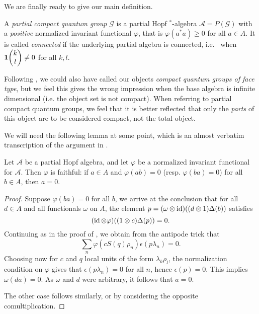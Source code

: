We are finally ready to give our main definition.

\begin{Def} A \emph{partial compact quantum group} $\mathscr{G}$ is a partial Hopf $^*$-algebra $\mathscr{A} = P(\mathscr{G})$ with a \emph{positive} normalized invariant functional $\varphi$, that is $\varphi(a^*a)\geq 0$ for all $a\in A$. It is called \emph{connected} if the underlying partial algebra is connected, i.e.~ when $\mathbf{1}\!\begin{pmatrix} k \\ l\end{pmatrix}\neq0$ for all $k,l$. %
\end{Def} 

\begin{Rem} Following \cite{Hay1}, we could also have called our objects \emph{compact quantum groups of face type}, but we feel this gives the wrong impression when the base algebra is infinite dimensional (i.e. the object set is not compact). When referring to partial compact quantum groups, we feel that it is better reflected that only the \emph{parts} of this object are to be considered compact, not the total object. %
\end{Rem} 

We will need the following lemma at some point, which is an almost verbatim transcription of the argument in \cite[Proposition 3.4]{VDae2}.

\begin{Lem} Let $\mathscr{A}$ be a partial Hopf algebra, and let $\varphi$ be a normalized invariant functional for $\mathscr{A}$. Then $\varphi$ is faithful: if $a\in A$ and $\varphi(ab) =0$ (resp. $\varphi(ba)=0$) for all $b\in A$, then $a=0$.
\end{Lem} 
\begin{proof} Suppose  $\varphi(ba)=0$ for all $b$, we arrive at the conclusion that for all $d\in A$ and all functionals $\omega$ on $A$, the element $p = (\omega\otimes \operatorname{id})((d\otimes 1)\Delta(b))$ satisfies \[(\operatorname{id}\otimes \varphi)((1\otimes c)\Delta(p)) = 0.\] Continuing as in the proof of \cite[Proposition 3.4]{VDae2}, we obtain from the antipode trick that \[\sum_n \varphi(cS(q)\rho_n)\epsilon(p\lambda_n)=0.\] Choosing now for $c$ and $q$ local units of the form $\lambda_k\rho_l$, the normalization condition on $\varphi$ gives that $\epsilon(p\lambda_n)=0$ for all $n$, hence $\epsilon(p)=0$. This implies $\omega(da)=0$. As $\omega$ and $d$ were arbitrary, it follows that $a=0$.

The other case follows similarly, or by considering the opposite comultiplication.
\end{proof} 




